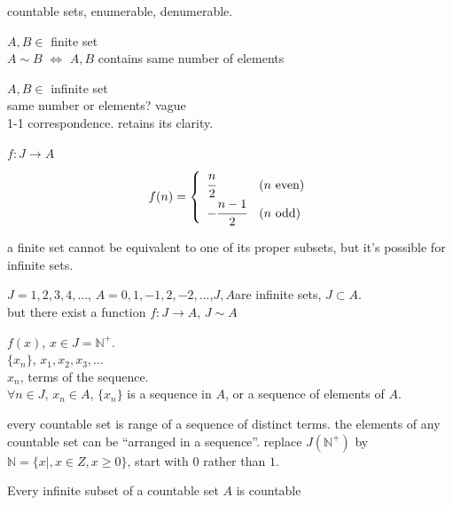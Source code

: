 countable sets, enumerable, denumerable.

$A, B \in$ finite set\\
$A\sim B$ $\Longleftrightarrow$ $A, B$ contains same number of elements

$A, B \in$ infinite set\\
same number or elements? vague\\
1-1 correspondence. retains its clarity.

\begin{newexample}
    $f:J\rightarrow A$
    \begin{equation*}
        f(n) = \left\{
            \begin{array}{ll}
                \cfrac{n}{2} & (n \text{  even})\\
                -\cfrac{n-1}{2} & (n \text{  odd})
            \end{array}
        \right.
    \end{equation*}
\end{newexample}

\begin{myremark}
    a finite set cannot be equivalent to one of its proper subsets, but it's possible for infinite sets.
\end{myremark}

$J = 1,2,3,4,...$, $A = 0,1,-1,2,-2,...$,$J, A$are infinite sets, $J \subset A$.\\
but there exist a function $f:J\rightarrow A$, $J \sim A$

\begin{mydef}
    \label{mydef:2.7}
    $f(x)$, $x\in J = \mathbb{N}^+$.\\
    $\{x_n\}$, $x_1,x_2,x_3,...$\\
    $x_n$, terms of the sequence.\\
    $\forall n\in J$, $x_n\in A$, $\{x_n\}$ is a sequence in $A$, or a sequence of elements of $A$.
\end{mydef}

every countable set is range of a sequence of distinct terms.
the elements of any countable set can be ``arranged in a sequence''.
replace $J(\mathbb{N}^+)$ by $\mathbb{N} = \{x|, x\in Z,x \geq 0\}$, start with $0$ rather than $1$.

\begin{thm}
    \label{thm:2.8}
    Every infinite subset of a countable set $A$ is countable
\end{thm}

